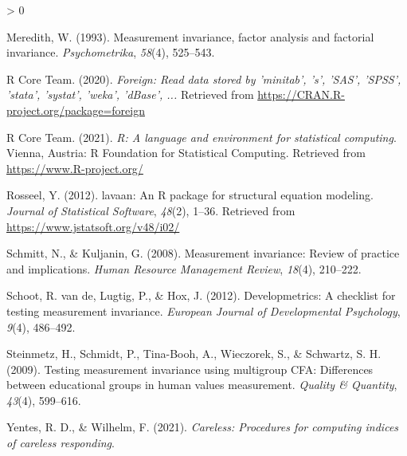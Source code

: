 \documentclass[
  english,
  man]{apa6}
\newlength{\cslhangindent}
\newenvironment{CSLReferences}[2] %
 {%
  \setlength{\parindent}{0pt}
  \ifodd #1 \everypar{\setlength{\hangindent}{\cslhangindent}}\ignorespaces\fi
  \ifnum #2 > 0
  \setlength{\parskip}{#2\baselineskip}
  \fi
 }%
 {}
\begin{document}
\begin{CSLReferences}{1}{0}
\leavevmode\hypertarget{ref-meredith1993measurement}{}%
Meredith, W. (1993). Measurement invariance, factor analysis and factorial invariance. \emph{Psychometrika}, \emph{58}(4), 525--543.

\leavevmode\hypertarget{ref-R-foreign}{}%
R Core Team. (2020). \emph{Foreign: Read data stored by 'minitab', 's', 'SAS', 'SPSS', 'stata', 'systat', 'weka', 'dBase', ...} Retrieved from \url{https://CRAN.R-project.org/package=foreign}

\leavevmode\hypertarget{ref-R-base}{}%
R Core Team. (2021). \emph{R: A language and environment for statistical computing}. Vienna, Austria: R Foundation for Statistical Computing. Retrieved from \url{https://www.R-project.org/}

\leavevmode\hypertarget{ref-R-lavaan}{}%
Rosseel, Y. (2012). {lavaan}: An {R} package for structural equation modeling. \emph{Journal of Statistical Software}, \emph{48}(2), 1--36. Retrieved from \url{https://www.jstatsoft.org/v48/i02/}

\leavevmode\hypertarget{ref-schmitt2008measurement}{}%
Schmitt, N., \& Kuljanin, G. (2008). Measurement invariance: Review of practice and implications. \emph{Human Resource Management Review}, \emph{18}(4), 210--222.

\leavevmode\hypertarget{ref-vandevelopmetrics}{}%
Schoot, R. van de, Lugtig, P., \& Hox, J. (2012). Developmetrics: A checklist for testing measurement invariance. \emph{European Journal of Developmental Psychology}, \emph{9}(4), 486--492.

\leavevmode\hypertarget{ref-steinmetz2009testing}{}%
Steinmetz, H., Schmidt, P., Tina-Booh, A., Wieczorek, S., \& Schwartz, S. H. (2009). Testing measurement invariance using multigroup CFA: Differences between educational groups in human values measurement. \emph{Quality \& Quantity}, \emph{43}(4), 599--616.

\leavevmode\hypertarget{ref-R-careless}{}%
Yentes, R. D., \& Wilhelm, F. (2021). \emph{Careless: Procedures for computing indices of careless responding}.

\end{CSLReferences}

\endgroup
\end{document}
